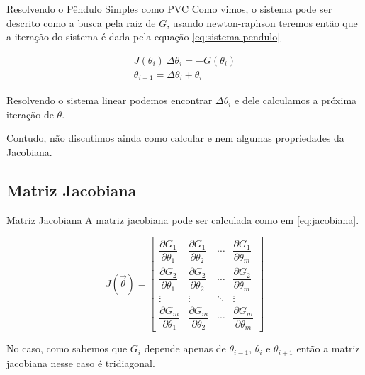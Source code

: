 \documentclass[11pt]{beamer}
\begin{document}
\begin{frame}{Resolvendo o Pêndulo Simples como PVC}
    Como vimos, o sistema pode ser descrito como a busca pela raiz de $G$, usando newton-raphson teremos então que a iteração do sistema é dada pela equação \ref{eq:sistema-pendulo}

    \begin{equation}
    \begin{split}
        J(\theta_i)\ \Delta \theta_i = -G(\theta_i) \\
        \theta_{i+1} = \Delta \theta_i + \theta_i
    \end{split}
    \label{eq:sistema-pendulo}
    \end{equation}

    Resolvendo o sistema linear podemos encontrar $\Delta\theta_i$ e dele calculamos a próxima iteração de $\theta$.

    \vspace{0.3cm}

    Contudo, não discutimos ainda como calcular e nem algumas propriedades da Jacobiana.
\end{frame}

\subsection{Matriz Jacobiana}

\begin{frame}{Matriz Jacobiana}
    A matriz jacobiana pode ser calculada como em \ref{eq:jacobiana}.

    \begin{equation}
        J(\vec{\theta}) = 
        \begin{bmatrix} 
            \dfrac{\partial G_1}{\partial \theta_1} & \dfrac{\partial G_1}{\partial \theta_2} & \cdots & \dfrac{\partial G_1}{\partial \theta_m} \\[1.0em]
            \dfrac{\partial G_2}{\partial \theta_1} & \dfrac{\partial G_2}{\partial \theta_2} & \cdots & \dfrac{\partial G_2}{\partial \theta_m} \\ 
            \vdots & \vdots & \ddots & \vdots \\ 
            \dfrac{\partial G_m}{\partial \theta_1} & \dfrac{\partial G_m}{\partial \theta_2} & \cdots & \dfrac{\partial G_m}{\partial \theta_m} 
        \end{bmatrix}
        \label{eq:jacobiana}
    \end{equation}

    \vspace{0.2cm}
    \pause

    No caso, como sabemos que $G_i$ depende apenas de $\theta_{i-1}$, $\theta_i$ e $\theta_{i+1}$ então a matriz jacobiana nesse caso é tridiagonal.
\end{frame}
\end{document}
